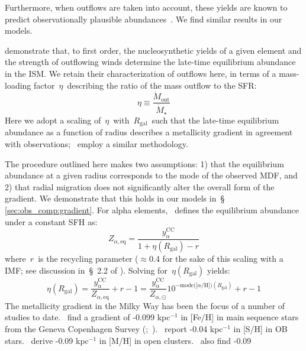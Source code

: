 \documentclass[fleqn, usenatbib]{mnras}
\begin{document}
Furthermore, when outflows are taken into account, these yields are known to 
predict observationally plausible abundances~\citep{Andrews2017, Weinberg2017}. 
We find similar results in our models. 
\par 
\citet{Weinberg2017} demonstrate that, to first order, the nucleosynthetic 
yields of a given element and the strength of outflowing winds determine the 
late-time equilibrium abundance in the ISM. We retain their characterization 
of outflows here, in terms of a mass-loading factor~$\eta$~describing the ratio 
of the mass outflow to the SFR: 
\begin{equation} 
\eta \equiv \frac{\dot{M}_\text{out}}{\dot{M}_\star} 
\end{equation} 
Here we adopt a scaling of~$\eta$~with~$R_\text{gal}$~such that the late-time 
equilibrium abundance as a function of radius describes a metallicity 
gradient in agreement with observations;~\citet{Nidever2014} employ a similar 
methodology. 
\par 
The procedure outlined here makes two assumptions: 1) that the equilibrium 
abundance at a given radius corresponds to the mode of the observed MDF, and 2) 
that radial migration does not significantly alter the overall form of the 
gradient. We demonstrate that this holds in our models in~\S 
\ref{sec:obs_comp:gradient}. For alpha elements,~\citet{Weinberg2017} defines 
the equilibrium abundance under a constant SFH as: 
\begin{equation} 
Z_{\alpha,\text{eq}} = \frac{y_\alpha^\text{CC}}{1 + \eta(R_\text{gal}) - r} 
\end{equation} 
where~$r$~is the recycling parameter ($\approx$0.4 for the sake of this scaling 
with a~\citealp{Kroupa2001} IMF; see discussion in~\S~2.2 
of \citealp{Weinberg2017}). Solving for~$\eta(R_\text{gal})$ yields: 
\begin{equation} 
\eta(R_\text{gal}) = \frac{y_\alpha^\text{CC}}{Z_{\alpha,\text{eq}}} + r - 1 = 
\frac{y_\alpha^\text{CC}}{Z_{\alpha,\odot}}10^{-\text{mode([$\alpha$/H])}
(R_\text{gal})} + r - 1 
\end{equation} 
The metallicity gradient in the Milky Way has been the focus of a number of 
studies to date.~\citet{Nordstroem2004b} find a gradient of -0.099 kpc$^{-1}$ 
in [Fe/H] in main sequence stars from the Geneva Copenhagen Survey 
(\citealp{Nordstroem2004a};~\citealp*{Holmberg2007}).~\citet{Daflon2009} report  
-0.04 kpc$^{-1}$ in [S/H] in OB stars.~\citet{Frinchaboy2013} derive -0.09 
kpc$^{-1}$ in [M/H] in open clusters.~\citet{Hayden2014} also find -0.09 
\end{document}
